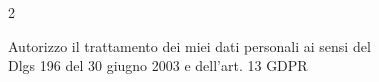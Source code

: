 \documentclass[allblack]{simplehipstercv}
\newlength{\rightcolwidth}
\begin{document}
\begin{paracol}{2}
\vfill{}
\bigskip

\setlength{\parindent}{0pt}
\begin{minipage}[t]{\rightcolwidth}
\begin{center}\fontfamily{\sfdefault}\selectfont \color{black!70}
Autorizzo il trattamento dei miei dati personali ai sensi del \\ Dlgs 196 del 30 giugno 2003 e dell’art. 13 GDPR
\end{center}
\end{minipage}

\end{paracol}
\end{document}
